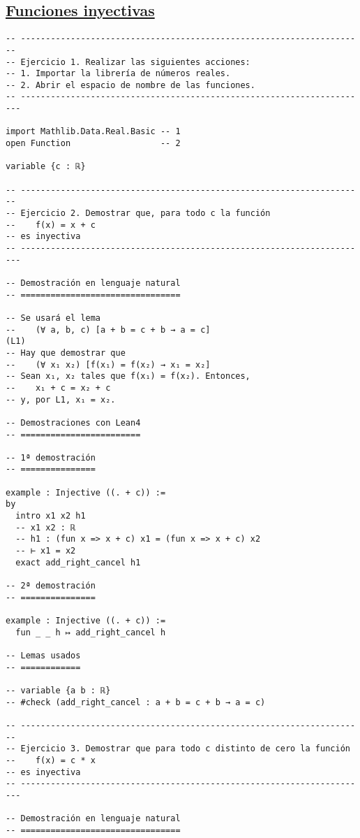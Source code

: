 \subsection{\href{./src/Logica/Funciones\_inyectivas.lean}{Funciones inyectivas}}
\label{sec:org7381d00}
\begin{verbatim}
-- ---------------------------------------------------------------------
-- Ejercicio 1. Realizar las siguientes acciones:
-- 1. Importar la librería de números reales.
-- 2. Abrir el espacio de nombre de las funciones.
-- ----------------------------------------------------------------------

import Mathlib.Data.Real.Basic -- 1
open Function                  -- 2

variable {c : ℝ}

-- ---------------------------------------------------------------------
-- Ejercicio 2. Demostrar que, para todo c la función
--    f(x) = x + c
-- es inyectiva
-- ----------------------------------------------------------------------

-- Demostración en lenguaje natural
-- ================================

-- Se usará el lema
--    (∀ a, b, c) [a + b = c + b → a = c]                            (L1)
-- Hay que demostrar que
--    (∀ x₁ x₂) [f(x₁) = f(x₂) → x₁ = x₂]
-- Sean x₁, x₂ tales que f(x₁) = f(x₂). Entonces,
--    x₁ + c = x₂ + c
-- y, por L1, x₁ = x₂.

-- Demostraciones con Lean4
-- ========================

-- 1ª demostración
-- ===============

example : Injective ((. + c)) :=
by
  intro x1 x2 h1
  -- x1 x2 : ℝ
  -- h1 : (fun x => x + c) x1 = (fun x => x + c) x2
  -- ⊢ x1 = x2
  exact add_right_cancel h1

-- 2ª demostración
-- ===============

example : Injective ((. + c)) :=
  fun _ _ h ↦ add_right_cancel h

-- Lemas usados
-- ============

-- variable {a b : ℝ}
-- #check (add_right_cancel : a + b = c + b → a = c)

-- ---------------------------------------------------------------------
-- Ejercicio 3. Demostrar que para todo c distinto de cero la función
--    f(x) = c * x
-- es inyectiva
-- ----------------------------------------------------------------------

-- Demostración en lenguaje natural
-- ================================


\end{verbatim}
